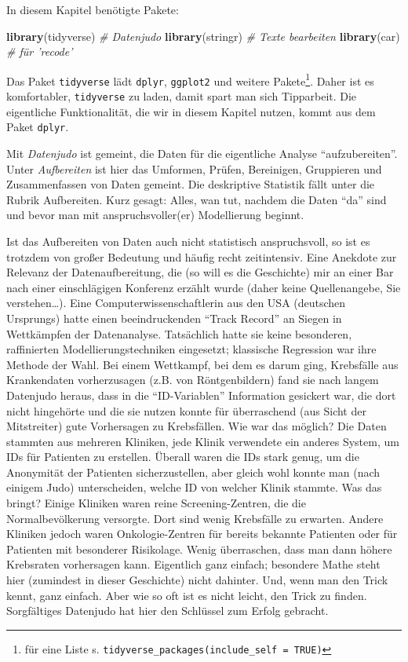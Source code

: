 \documentclass[12pt,ngerman,]{book}
\makeatletter
\newenvironment{Shaded}{\begin{snugshade}}{\end{snugshade}}
\newcommand{\KeywordTok}[1]{\textcolor[rgb]{0.13,0.29,0.53}{\textbf{{#1}}}}
\newcommand{\CommentTok}[1]{\textcolor[rgb]{0.56,0.35,0.01}{\textit{{#1}}}}
\newcommand{\NormalTok}[1]{{#1}}
\let\rmarkdownfootnote\footnote%
\def\footnote{\protect\rmarkdownfootnote}
\newenvironment{kframe}{%
\medskip{}
\setlength{\fboxsep}{.8em}
 \def\at@end@of@kframe{}%
 \ifinner\ifhmode%
  \def\at@end@of@kframe{\end{minipage}}%
  \begin{minipage}{\columnwidth}%
 \fi\fi%
 \def\FrameCommand##1{\hskip\@totalleftmargin \hskip-\fboxsep
 \colorbox{shadecolor}{##1}\hskip-\fboxsep
     \hskip-\linewidth \hskip-\@totalleftmargin \hskip\columnwidth}%
 \MakeFramed {\advance\hsize-\width
   \@totalleftmargin\z@ \linewidth\hsize
   \@setminipage}}%
 {\par\unskip\endMakeFramed%
 \at@end@of@kframe}
\renewenvironment{Shaded}{\begin{kframe}}{\end{kframe}}
\makeatother
\begin{document}
In diesem Kapitel benötigte Pakete:

\begin{Shaded}
\begin{Highlighting}[]
\KeywordTok{library}\NormalTok{(tidyverse)  }\CommentTok{# Datenjudo}
\KeywordTok{library}\NormalTok{(stringr)   }\CommentTok{# Texte bearbeiten}
\KeywordTok{library}\NormalTok{(car)  }\CommentTok{# für 'recode'}
\end{Highlighting}
\end{Shaded}

Das Paket \texttt{tidyverse} lädt \texttt{dplyr}, \texttt{ggplot2} und
weitere Pakete\footnote{für eine Liste s.
  \texttt{tidyverse\_packages(include\_self\ =\ TRUE)}}. Daher ist es
komfortabler, \texttt{tidyverse} zu laden, damit spart man sich
Tipparbeit. Die eigentliche Funktionalität, die wir in diesem Kapitel
nutzen, kommt aus dem Paket \texttt{dplyr}.

Mit \emph{Datenjudo} ist gemeint, die Daten für die
eigentliche Analyse ``aufzubereiten''. Unter
\emph{Aufbereiten} ist hier das Umformen, Prüfen,
Bereinigen, Gruppieren und Zusammenfassen von Daten gemeint. Die
deskriptive Statistik fällt unter die Rubrik Aufbereiten. Kurz gesagt:
Alles, wan tut, nachdem die Daten ``da'' sind und bevor man mit
anspruchsvoller(er) Modellierung beginnt.

Ist das Aufbereiten von Daten auch nicht statistisch anspruchsvoll, so
ist es trotzdem von großer Bedeutung und häufig recht zeitintensiv. Eine
Anekdote zur Relevanz der Datenaufbereitung, die (so will es die
Geschichte) mir an einer Bar nach einer einschlägigen Konferenz erzählt
wurde (daher keine Quellenangebe, Sie verstehen\ldots{}). Eine
Computerwissenschaftlerin aus den USA (deutschen Ursprungs) hatte einen
beeindruckenden ``Track Record'' an Siegen in Wettkämpfen der
Datenanalyse. Tatsächlich hatte sie keine besonderen, raffinierten
Modellierungstechniken eingesetzt; klassische Regression war ihre
Methode der Wahl. Bei einem Wettkampf, bei dem es darum ging, Krebsfälle
aus Krankendaten vorherzusagen (z.B. von Röntgenbildern) fand sie nach
langem Datenjudo heraus, dass in die ``ID-Variablen'' Information
gesickert war, die dort nicht hingehörte und die sie nutzen konnte für
überraschend (aus Sicht der Mitstreiter) gute Vorhersagen zu
Krebsfällen. Wie war das möglich? Die Daten stammten aus mehreren
Kliniken, jede Klinik verwendete ein anderes System, um IDs für
Patienten zu erstellen. Überall waren die IDs stark genug, um die
Anonymität der Patienten sicherzustellen, aber gleich wohl konnte man
(nach einigem Judo) unterscheiden, welche ID von welcher Klinik stammte.
Was das bringt? Einige Kliniken waren reine Screening-Zentren, die die
Normalbevölkerung versorgte. Dort sind wenig Krebsfälle zu erwarten.
Andere Kliniken jedoch waren Onkologie-Zentren für bereits bekannte
Patienten oder für Patienten mit besonderer Risikolage. Wenig
überraschen, dass man dann höhere Krebsraten vorhersagen kann.
Eigentlich ganz einfach; besondere Mathe steht hier (zumindest in dieser
Geschichte) nicht dahinter. Und, wenn man den Trick kennt, ganz einfach.
Aber wie so oft ist es nicht leicht, den Trick zu finden. Sorgfältiges
Datenjudo hat hier den Schlüssel zum Erfolg gebracht.
\end{document}
